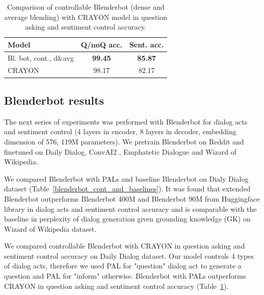 \documentclass[11pt]{article}
\begin{document}
\begin{table}[ht]
\fontsize{9}{11}
\selectfont 
\centering
\begin{tabular}{lcc}
\hline
Model                          & Q/noQ acc.  & Sent. acc. \\ \hline
Bl. bot, cont., d\&avg & \textbf{99.45} & \textbf{85.87} \\
CRAYON                         & 98.17 & 82.17 \\
\hline
\end{tabular}
\caption{Comparison of controllable Blenderbot (dense and average blending) with CRAYON model in question asking and sentiment control accuracy.}
\label{blenderbot_cont_and_crayon}
\end{table}

\subsection{Blenderbot results}

The next series of experiments was performed with Blenderbot for dialog acts and sentiment control (4 layers in encoder, 8 layers in decoder, embedding dimension of 576, 119M parameters). %
We pretrain Blenderbot on Reddit and finetuned on Daily Dialog, ConvAI2 \cite{dinan2020second}, Emphatetic Dialogue and Wizard of Wikipedia.

We compared Blenderbot with PALs and baseline Blenderbot on Dialy Dialog dataset (Table~\ref{blenderbot_cont_and_baselines}). It was found that extended Blenderbot outperforms Blenderbot 400M and Blenderbot 90M from Huggingface library in dialog acts and sentiment control accuracy and is comparable with the baseline in perplexity of dialog generation given grounding knowledge (GK) on Wizard of Wikipedia dataset.

We compared controllable Blenderbot with CRAYON \cite{hu2021controllable} in question asking and sentiment control accuracy on Daily Dialog dataset. Our model controls 4 types of dialog acts, therefore we used PAL for "question"{} dialog act to generate a question and PAL for "inform" otherwise. Blenderbot with PALs outperforms CRAYON in question asking and sentiment control accuracy (Table~\ref{blenderbot_cont_and_crayon}).
\end{document}
